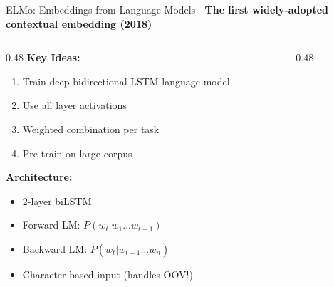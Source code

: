 \documentclass[aspectratio=169]{beamer}
\begin{document}
\begin{frame}[shrink=10]{ELMo: Embeddings from Language Models 🔮}
\textbf{The first widely-adopted contextual embedding (2018)}

\vspace{1em}

\begin{columns}[T]
\begin{column}{0.48\textwidth}
\textbf{Key Ideas:}
\begin{enumerate}\setlength{\itemsep}{0pt}
    \item Train deep \alert{bidirectional LSTM} language model
    \item Use \alert{all layer} activations
    \item Weighted combination per task
    \item Pre-train on large corpus
\end{enumerate}

\vspace{0.5em}
\textbf{Architecture:}
\begin{itemize}\setlength{\itemsep}{0pt}
    \item 2-layer biLSTM
    \item Forward LM: $P(w_t | w_1...w_{t-1})$
    \item Backward LM: $P(w_t | w_{t+1}...w_n)$
    \item Character-based input (handles OOV!)
\end{itemize}
\end{column}

\begin{column}{0.48\textwidth}
\begin{center}
\end{center}
\end{column}
\end{columns}
\end{frame}
\end{document}
